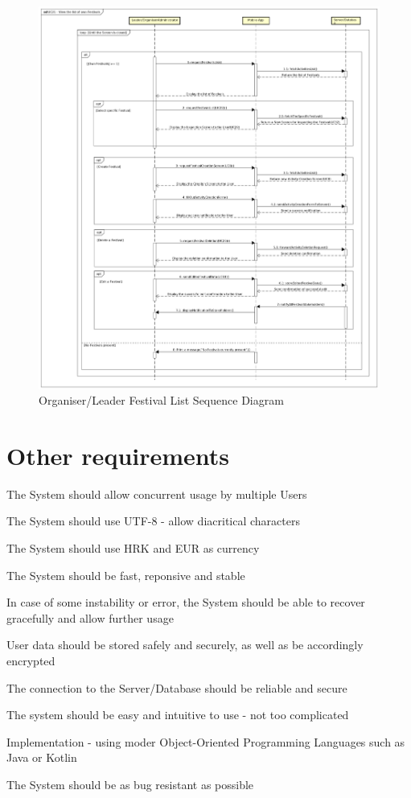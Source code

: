 				\begin{figure}[H]
					\includegraphics[width=\linewidth]{diagrams/sd-diag3-festivalList.png}
					\caption{Organiser/Leader Festival List Sequence Diagram}
					\label{fig:sd3_festival_list}
				\end{figure}
				
				\eject
	
		\section{Other requirements}
			 
			 \begin{packed_item}
			 	\item The System should allow concurrent usage by multiple Users
			 	\item The System should use UTF-8 - allow diacritical characters
			 	\item The System should use HRK and EUR as currency
			 	\item The System should be fast, reponsive and stable
			 	\item In case of some instability or error, the System should be able to recover gracefully and allow further usage
			 	\item User data should be stored safely and securely, as well as be accordingly encrypted
			 	\item The connection to the Server/Database should be reliable and secure
			 	\item The system should be easy and intuitive to use - not too complicated
			 	\item Implementation - using moder Object-Oriented Programming Languages such as Java or Kotlin
			 	\item The System should be as bug resistant as possible
			 \end{packed_item}
